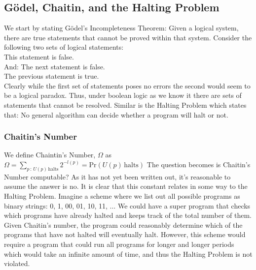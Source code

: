 \documentclass[11pt]{article}
\theoremstyle{definition}
\begin{document}
\subsection{G\"odel, Chaitin, and the Halting Problem}
We start by stating G\"odel's Incompleteness Theorem: 
\theorem Given a logical system, there are true statements that cannot be proved within that system. 
Consider the following two sets of logical statements:\\
This statement is false.\\
And:
The next statement is false.\\
The previous statement is true.\\

Clearly while the first set of statements poses no errors the second would seem to be a logical paradox. Thus, under boolean logic as we know it there are sets of statements that cannot be resolved. 
Similar is the Halting Problem which states that: 
\theorem No general algorithm can decide whether a program will halt or not.
\subsubsection {Chaitin's Number}
We define Chaintin's Number, $\Omega$ as
 $\displaystyle \Omega = \sum_{p \, : \, U(p) \, \mathrm{halts}} 2^{-l(p)} = \mathrm{Pr}(U(p) \, \mathrm{halts})$
The question becomes is Chaitin's Number computable? As it has not yet been written out, it's reasonable to assume the answer is no. It is clear that this constant relates in some way to the Halting Problem. Imagine a scheme where we list out all possible programs as binary strings: 0, 1, 00, 01, 10, 11, $\dots$
We could have a super program that checks which programs have already halted and keeps track of the total number of them. Given Chaitin's number, the program could reasonably determine which of the programs that have not halted will eventually halt. However, this scheme would require a program that could run all programs for longer and longer periods which would take an infinite amount of time, and thus the Halting Problem is not violated. 
\newpage
\end{document}
